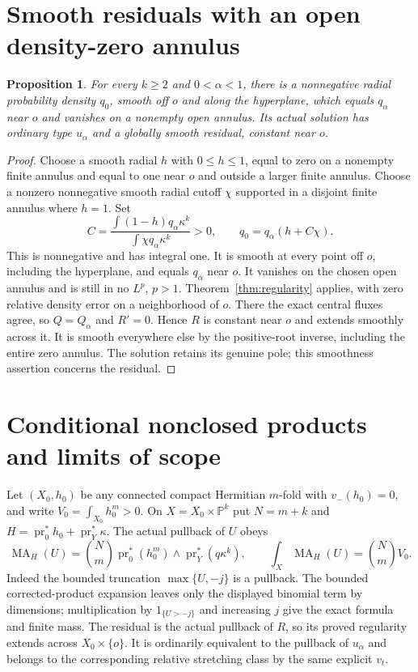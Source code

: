 \documentclass[11pt]{article}
\newcommand{\PP}{\mathbb P}
\newcommand{\MA}{\operatorname{MA}}
\newtheorem{proposition}[theorem]{Proposition}
\theoremstyle{remark}\newtheorem{remark}[theorem]{Remark}
\begin{document}
\section{Smooth residuals with an open density-zero annulus}
\begin{proposition}\label{prop:zeros}
For every $k\ge2$ and $0<\alpha<1$, there is a nonnegative radial
probability density $q_0$, smooth off $o$ and along the hyperplane,
which equals $q_\alpha$ near $o$ and vanishes on a nonempty open
annulus. Its actual solution has ordinary type $u_\alpha$ and a
globally smooth residual, constant near $o$.
\end{proposition}
\begin{proof}
Choose a smooth radial $h$ with $0\le h\le1$, equal to zero on
a nonempty finite annulus and equal to one near $o$ and outside
a larger finite annulus. Choose a nonzero nonnegative smooth radial
cutoff $\chi$ supported in a disjoint finite annulus where $h=1$.
Set
\[
 C=\frac{\int(1-h)q_\alpha\kappa^k}{\int\chi q_\alpha\kappa^k}>0,
 \qquad q_0=q_\alpha(h+C\chi).
\]
This is nonnegative and has integral one. It is smooth at every
point off $o$, including the hyperplane, and equals $q_\alpha$
near $o$. It vanishes on the chosen open annulus and is still in
no $L^p$, $p>1$. Theorem~\ref{thm:regularity} applies, with
zero relative density error on a neighborhood of $o$. There the
exact central fluxes agree, so $Q=Q_\alpha$ and $R'=0$.
Hence $R$ is constant near $o$ and extends smoothly across it.
It is smooth everywhere else by the positive-root inverse, including
the entire zero annulus. The solution retains its genuine pole;
this smoothness assertion concerns the residual.
\end{proof}

\section{Conditional nonclosed products and limits of scope}
Let $(X_0,h_0)$ be any connected compact Hermitian $m$-fold with
$v_-(h_0)=0$, and write $V_0=\int_{X_0}h_0^m>0$.
On $X=X_0\times\PP^k$ put $N=m+k$ and
$H=\operatorname{pr}_0^*h_0+\operatorname{pr}_Y^*\kappa$.
The actual pullback of $U$ obeys
\[
 \MA_H(U)=\binom Nm\operatorname{pr}_0^*(h_0^m)
                 \wedge\operatorname{pr}_Y^*(q\kappa^k),
 \qquad \int_X\MA_H(U)=\binom Nm V_0.
\]
Indeed the bounded truncation $\max\{U,-j\}$ is a pullback.
The bounded corrected-product expansion leaves only the displayed
binomial term by dimensions; multiplication by $1_{\{U>-j\}}$
and increasing $j$ give the exact formula and finite mass.
The residual is the actual pullback of $R$, so its proved regularity
extends across $X_0\times\{o\}$. It is ordinarily equivalent to the
pullback of $u_\alpha$ and belongs to the corresponding relative
stretching class by the same explicit $v_t$.
\end{document}
